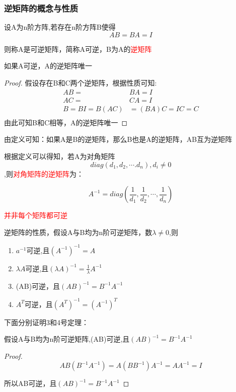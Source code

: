 \subsubsection{逆矩阵的概念与性质}

设A为n阶方阵,若存在n阶方阵B使得
$$
	AB=BA=I
$$

则称A是可逆矩阵，简称A可逆，B为A的\textcolor{red}{逆矩阵}

\begin{example}
	如果A可逆，A的逆矩阵唯一

	\begin{proof}
		假设存在B和C两个逆矩阵，根据性质可知:
		$$
			\begin{aligned}
				AB=        & BA=I        \\
				AC=        & CA=I        \\
				B=BI=B(AC) & =(BA)C=IC=C \\
			\end{aligned}
		$$
		由此可知B和C相等，A的逆矩阵唯一
	\end{proof}
\end{example}

由定义可知：如果A是B的逆矩阵，那么B也是A的逆矩阵，AB互为逆矩阵


根据定义可以得知，若A为对角矩阵
$$diag(d_1,d_2,\cdots.d_n),d_i\neq 0$$
,则\textcolor{red}{对角矩阵的逆矩阵}为：

$$
	A^{-1}=diag(\frac{1}{d_1},\frac{1}{d_2},\cdots,\frac{1}{d_n})
$$

\textcolor{red}{并非每个矩阵都可逆}

\begin{definition}

	逆矩阵的性质，假设A与B均为n阶可逆矩阵，数$\lambda\neq 0$,则

	\begin{enumerate}
		\item {$a^{-1}$可逆,且$(A^{-1})^{-1}=A$}
		\item $\lambda A$可逆,且$(\lambda A)^{-1}=\frac{1}{\lambda}A^{-1}$
		\item (AB)可逆，且$(AB)^{-1}=B^{-1}A^{-1}$
		\item $A^T$可逆，且$(A^T)^{-1}=(A^{-1})^T$
	\end{enumerate}
\end{definition}

下面分别证明3和4号定理：

\begin{example}
	假设A与B均为n阶可逆矩阵,(AB)可逆,且$(AB)^{-1}=B^{-1}A^{-1}$

	\begin{proof}
		$$
			AB(B^{-1}A^{-1})=A(BB^{-1})A^{-1}=AA^{-1}=I
		$$

		所以AB可逆，且$(AB)^{-1}=B^{-1}A^{-1}$
	\end{proof}
\end{example}

